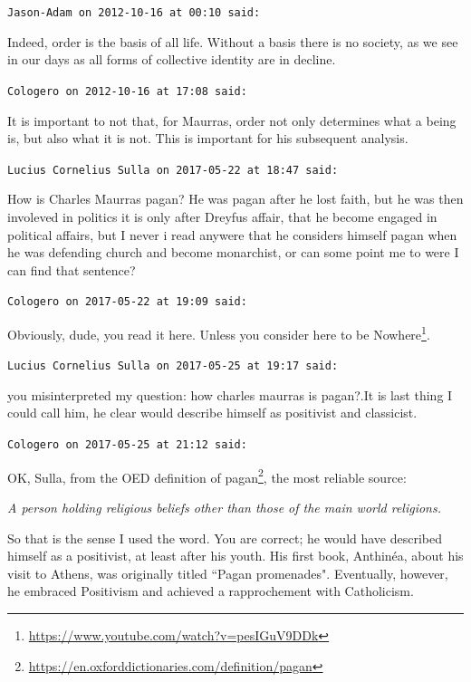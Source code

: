 \begin{footnotesize}\begin{sffamily}



\texttt{Jason-Adam on 2012-10-16 at 00:10 said: }

Indeed, order is the basis of all life. Without a basis there is no society, as we see in our days as all forms of collective identity are in decline.


\hfill

\texttt{Cologero on 2012-10-16 at 17:08 said: }

It is important to not that, for Maurras, order not only determines what a being is, but also what it is not. This is important for his subsequent analysis.


\hfill

\texttt{Lucius Cornelius Sulla on 2017-05-22 at 18:47 said: }

How is Charles Maurras pagan? He was pagan after he lost faith, but he was then involeved in politics it is only after Dreyfus affair, that he become engaged in political affairs, but I never i read anywere that he considers himself pagan when he was defending church and become monarchist, or can some point me to were I can find that sentence?


\hfill

\texttt{Cologero on 2017-05-22 at 19:09 said: }

Obviously, dude, you read it here. Unless you consider here to be Nowhere\footnote{\url{https://www.youtube.com/watch?v=pesIGuV9DDk}}.


\hfill

\texttt{Lucius Cornelius Sulla on 2017-05-25 at 19:17 said: }

you misinterpreted my question: how charles maurras is pagan?.It is last thing I could call him, he clear would describe himself as positivist and classicist.


\hfill

\texttt{Cologero on 2017-05-25 at 21:12 said: }

OK, Sulla, from the OED definition of pagan\footnote{\url{https://en.oxforddictionaries.com/definition/pagan}}, the most reliable source:

\emph{A person holding religious beliefs other than those of the main world religions.}

So that is the sense I used the word. You are correct; he would have described himself as a positivist, at least after his youth. His first book, Anthinéa, about his visit to Athens, was originally titled ``Pagan promenades". Eventually, however, he embraced Positivism and achieved a rapprochement with Catholicism.


\end{sffamily}
\end{footnotesize}
